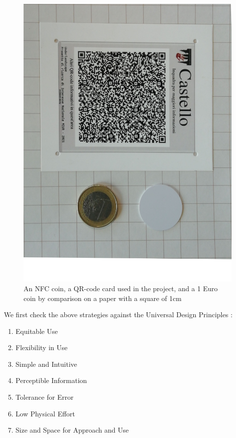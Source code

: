 \documentclass[sustainability,article,submit,pdftex,moreauthors]{Definitions/mdpi}
\begin{document}
\begin{figure}
	\centering
	\includegraphics[width=0.9\linewidth]{figure/qr+NFC+coin}
	\caption[Passive devices dimensions]{An NFC coin, a QR-code card used in the project, and a 1 Euro coin by comparison on a paper with a square of 1cm}
	\label{fig:qrnfccoin}
\end{figure}

We first check the above strategies against the Universal Design Principles \cite{udi97a}:

\begin{enumerate}
	\item Equitable Use
	\item Flexibility in Use
	\item Simple and Intuitive
	\item Perceptible Information
	\item Tolerance for Error
	\item Low Physical Effort
	\item Size and Space for Approach and Use
\end{enumerate}
\end{document}
